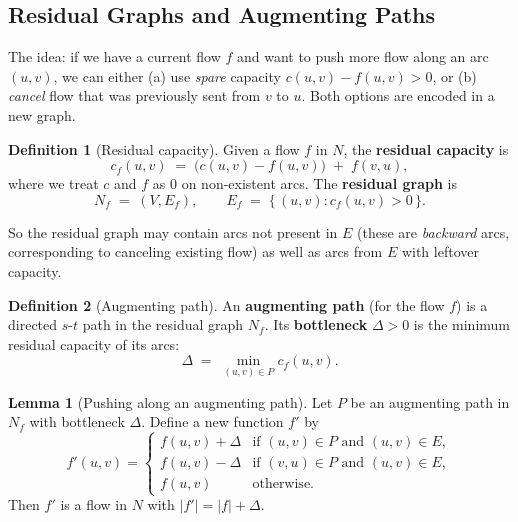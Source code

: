 \documentclass{article}
\theoremstyle{definition}
\newtheorem{lemma}{Lemma}
\newtheorem{definition}{Definition}
\begin{document}
\subsection{Residual Graphs and Augmenting Paths}

The idea: if we have a current flow $f$ and want to push more flow
along an arc $(u, v)$, we can either (a) use \emph{spare} capacity
$c(u, v) - f(u, v) > 0$, or (b) \emph{cancel} flow that was previously
sent from $v$ to $u$. Both options are encoded in a new graph.

\begin{definition}[Residual capacity]
Given a flow $f$ in $N$, the \textbf{residual capacity} is
\[
  c_f(u, v) \;=\; \big(c(u, v) - f(u, v)\big) \;+\; f(v, u),
\]
where we treat $c$ and $f$ as $0$ on non-existent arcs. The
\textbf{residual graph} is
\[
  N_f \;=\; (V, E_f), \qquad
  E_f \;=\; \{\, (u, v) : c_f(u, v) > 0 \,\}.
\]
\end{definition}

So the residual graph may contain arcs not present in $E$ (these are
\emph{backward} arcs, corresponding to canceling existing flow) as
well as arcs from $E$ with leftover capacity.

\begin{definition}[Augmenting path]
An \textbf{augmenting path} (for the flow $f$) is a directed $s$-$t$
path in the residual graph $N_f$. Its \textbf{bottleneck}
$\Delta > 0$ is the minimum residual capacity of its arcs:
\[
  \Delta \;=\; \min_{(u, v) \in P} c_f(u, v).
\]
\end{definition}

\begin{lemma}[Pushing along an augmenting path]\label{lem:augment}
Let $P$ be an augmenting path in $N_f$ with bottleneck $\Delta$.
Define a new function $f'$ by
\[
  f'(u, v) = \begin{cases}
    f(u, v) + \Delta & \text{if } (u, v) \in P \text{ and } (u, v) \in E, \\
    f(u, v) - \Delta & \text{if } (v, u) \in P \text{ and } (u, v) \in E, \\
    f(u, v)          & \text{otherwise.}
  \end{cases}
\]
Then $f'$ is a flow in $N$ with $|f'| = |f| + \Delta$.
\end{lemma}
\end{document}
